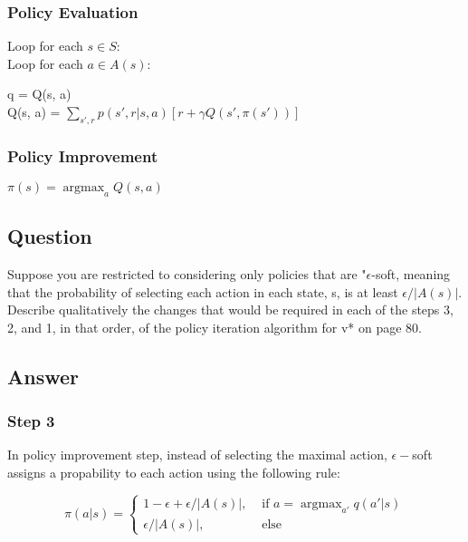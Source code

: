 \documentclass[11pt]{article}
\DeclareMathOperator*{\argmax}{argmax}
\begin{document}
    \subsubsection*{Policy Evaluation}
    Loop for each $ s \in S $: \\
    Loop for each $ a \in A(s) $: \\
    \begin{itemize}
        q = Q(s, a) \\
        Q(s, a) = $ \sum_{s',r} p(s',r| s, a) [ r + \gamma Q(s', \pi(s'))  ] $
    \end{itemize}

    \subsubsection*{Policy Improvement}
    $ \pi(s) = \argmax_{a} Q(s, a) $

    \subsection{Question}

    Suppose you are restricted to considering only policies that are "$\epsilon$-soft, meaning that the probability of selecting each action in each state, s, is at least $\epsilon/|A(s)|$.
    Describe qualitatively the changes that would be required in each of the steps 3, 2, and 1, in that order, of the policy iteration algorithm for v* on page 80.

    \subsection*{Answer}

    \subsubsection*{Step 3}

    In policy improvement step, instead of selecting the maximal action, $ \epsilon-$soft assigns a propability to each action using the following rule:

    \begin{equation}
        \pi(a|s) =
        \begin{cases}
            1-\epsilon + \epsilon/|A(s)|,& \text{ if } a = \argmax_{a'}q(a'|s) \\
            \epsilon/|A(s)|,& \text{ else }
        \end{cases}
    \end{equation}
\end{document}
